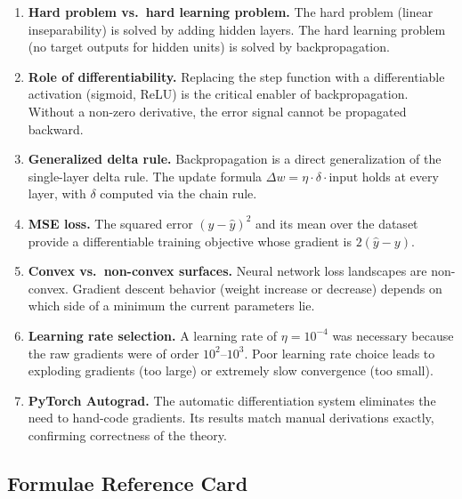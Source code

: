 \documentclass[12pt,a4paper]{article}
\begin{document}
\begin{enumerate}[label=\arabic*.,noitemsep]
  \item \textbf{Hard problem vs.\ hard learning problem.}  The hard problem
        (linear inseparability) is solved by adding hidden layers.  The hard
        learning problem (no target outputs for hidden units) is solved by
        backpropagation.

  \item \textbf{Role of differentiability.}  Replacing the step function with
        a differentiable activation (sigmoid, ReLU) is the critical enabler of
        backpropagation.  Without a non-zero derivative, the error signal
        cannot be propagated backward.

  \item \textbf{Generalized delta rule.}  Backpropagation is a direct
        generalization of the single-layer delta rule.  The update formula
        $\Delta w = \eta \cdot \delta \cdot \text{input}$ holds at every layer,
        with $\delta$ computed via the chain rule.

  \item \textbf{MSE loss.}  The squared error $(y - \hat{y})^2$ and its mean
        over the dataset provide a differentiable training objective whose
        gradient is $2(\hat{y}-y)$.

  \item \textbf{Convex vs.\ non-convex surfaces.}  Neural network loss
        landscapes are non-convex.  Gradient descent behavior (weight
        increase or decrease) depends on which side of a minimum the current
        parameters lie.

  \item \textbf{Learning rate selection.}  A learning rate of $\eta = 10^{-4}$
        was necessary because the raw gradients were of order $10^2$--$10^3$.
        Poor learning rate choice leads to exploding gradients (too large) or
        extremely slow convergence (too small).

  \item \textbf{PyTorch Autograd.}  The automatic differentiation system
        eliminates the need to hand-code gradients.  Its results match manual
        derivations exactly, confirming correctness of the theory.
\end{enumerate}

\subsection{Formulae Reference Card}
\end{document}
